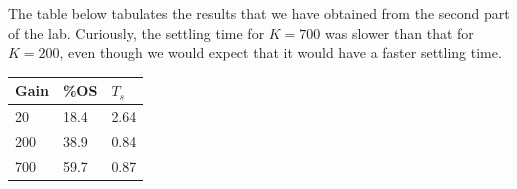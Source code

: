 \documentclass[12pt, a4paper]{article}
\begin{document}
		The table below tabulates the results that we have obtained from the second part of the lab. Curiously, the settling time for $K = 700$ was slower than that for $K = 200$, even though we would expect that it would have a faster settling time.
		\begin{table}[H]
			\begin{tabularx}{\textwidth}{X X X}
				\toprule
				Gain & \%OS & $T_s$ \\
				\midrule
				20 & 18.4 & 2.64 \\
				200 & 38.9 & 0.84 \\
				700 & 59.7 & 0.87 \\
				\bottomrule
			\end{tabularx}
		\end{table}
\end{document}

